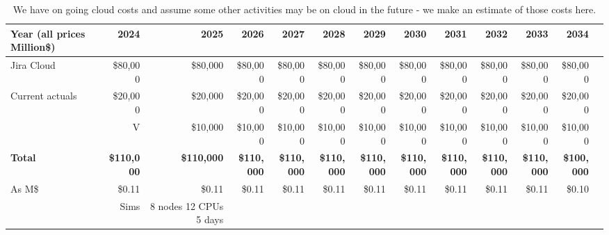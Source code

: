\tiny \begin{longtable} { |p{}  |r  |r  |r  |r  |r  |r  |r  |r  |r  |r  |r  |r |} 
\caption{We have on going cloud costs and assume some other activities may be on cloud in the future - we make an estimate of those costs here. \label{tab:cloud}}\\ 
\hline 
\textbf{Year  (all prices Million\$)}&\textbf{2024}&\textbf{2025}&\textbf{2026}&\textbf{2027}&\textbf{2028}&\textbf{2029}&\textbf{2030}&\textbf{2031}&\textbf{2032}&\textbf{2033}&\textbf{2034} \\ \hline
{Jira Cloud}&{\$80,000}&{\$80,000}&{\$80,000}&{\$80,000}&{\$80,000}&{\$80,000}&{\$80,000}&{\$80,000}&{\$80,000}&{\$80,000}&{\$80,000} \\ \hline
{Current actuals}&{\$20,000}&{\$20,000}&{\$20,000}&{\$20,000}&{\$20,000}&{\$20,000}&{\$20,000}&{\$20,000}&{\$20,000}&{\$20,000}&{\$20,000} \\ \hline
{RPF sims, V&V}&{\$10,000}&{\$10,000}&{\$10,000}&{\$10,000}&{\$10,000}&{\$10,000}&{\$10,000}&{\$10,000}&{\$10,000}&{\$10,000}& \\ \hline
\textbf{Total}&\textbf{\$110,000}&\textbf{\$110,000}&\textbf{\$110,000}&\textbf{\$110,000}&\textbf{\$110,000}&\textbf{\$110,000}&\textbf{\$110,000}&\textbf{\$110,000}&\textbf{\$110,000}&\textbf{\$110,000}&\textbf{\$100,000} \\ \hline
{As M\$}&{\$0.11}&{\$0.11}&{\$0.11}&{\$0.11}&{\$0.11}&{\$0.11}&{\$0.11}&{\$0.11}&{\$0.11}&{\$0.11}&{\$0.10} \\ \hline
{}&{Sims }&{8 nodes 12 CPUs 5 days}&&&&&&&&& \\ \hline
\end{longtable} \normalsize
